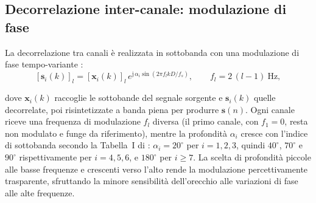 \documentclass[11pt,a4paper]{article}
\begin{document}
	\subsection{Decorrelazione inter-canale: modulazione di fase}\label{ssec:ph_mod}
	La decorrelazione tra canali è realizzata in sottobanda con una modulazione di fase tempo-variante \cite{11464373}:
	\begin{equation}
		\left[\mathbf{s}_i(k)\right]_l = \left[\mathbf{x}_i(k)\right]_l\, e^{\mathrm{j}\,\alpha_i \sin\left(2\pi f_l k D / f_s\right)},
		\qquad f_l = 2\,(l-1)\ \si{\hertz},
		\label{eq:phase_mod}
	\end{equation}
	
	dove $\mathbf{x}_i(k)$ raccoglie le sottobande del segnale sorgente e $\mathbf{s}_i(k)$ quelle decorrelate, poi risintetizzate a banda piena per produrre $\mathbf{s}(n)$.
	Ogni canale riceve una frequenza di modulazione $f_l$ diversa (il primo canale, con $f_1 = 0$, resta non modulato e funge da riferimento), mentre la profondità $\alpha_i$ cresce con l'indice di sottobanda secondo la Tabella~I di \cite{11464373}: $\alpha_i = 20^\circ$ per $i = 1,2,3$, quindi $40^\circ$, $70^\circ$ e $90^\circ$ rispettivamente per $i = 4,5,6$, e $180^\circ$ per $i \geq 7$.
	La scelta di profondità piccole alle basse frequenze e crescenti verso l'alto rende la modulazione percettivamente trasparente, sfruttando la minore sensibilità dell'orecchio alle variazioni di fase alle alte frequenze.
	
\end{document}
